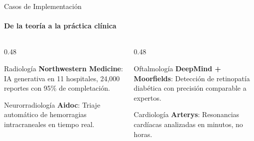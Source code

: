 \begin{frame}{Casos de Implementación}
\framesubtitle{De la teoría a la práctica clínica}

\begin{columns}[T]
\begin{column}{0.48\textwidth}
\begin{block}{\faHospital\; Radiología}
\textbf{Northwestern Medicine}: IA generativa en 11 hospitales, 24,000 reportes con 95\% de completación.
\end{block}
\vspace{3pt}
\begin{block}{\faBrain\; Neurorradiología}
\textbf{Aidoc}: Triaje automático de hemorragias intracraneales en tiempo real.
\end{block}
\end{column}
\begin{column}{0.48\textwidth}
\begin{block}{\faEye\; Oftalmología}
\textbf{DeepMind + Moorfields}: Detección de retinopatía diabética con precisión comparable a expertos.
\end{block}
\vspace{3pt}
\begin{block}{\faHeartbeat\; Cardiología}
\textbf{Arterys}: Resonancias cardíacas analizadas en minutos, no horas.
\end{block}
\end{column}
\end{columns}

\end{frame}
